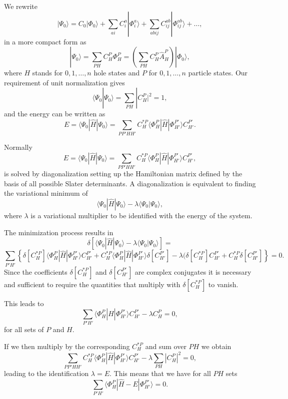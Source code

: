 We rewrite 
\[
|\Psi_0\rangle=C_0|\Phi_0\rangle+\sum_{ai}C_i^a|\Phi_i^a\rangle+\sum_{abij}C_{ij}^{ab}|\Phi_{ij}^{ab}\rangle+\dots,
\]
in a more compact form as 
\[
|\Psi_0\rangle=\sum_{PH}C_H^P\Phi_H^P=\left(\sum_{PH}C_H^P\hat{A}_H^P\right)|\Phi_0\rangle,
\]
where $H$ stands for $0,1,\dots,n$ hole states and $P$ for $0,1,\dots,n$ particle states. 
Our requirement of unit normalization gives
\[
\langle \Psi_0 | \Psi_0 \rangle = \sum_{PH}|C_H^P|^2= 1,
\]
and the energy can be written as 
\[
E= \langle \Psi_0 | \hat{H} |\Psi_0 \rangle= \sum_{PP'HH'}C_H^{*P}\langle \Phi_H^P | \hat{H} |\Phi_{H'}^{P'} \rangle C_{H'}^{P'}.
\]


Normally 
\[
E= \langle \Psi_0 | \hat{H} |\Psi_0 \rangle= \sum_{PP'HH'}C_H^{*P}\langle \Phi_H^P | \hat{H} |\Phi_{H'}^{P'} \rangle C_{H'}^{P'},
\]
is solved by diagonalization setting up the Hamiltonian matrix defined by the basis of all possible Slater determinants. A diagonalization
is equivalent to finding the variational minimum   of 
\[
 \langle \Psi_0 | \hat{H} |\Psi_0 \rangle-\lambda \langle \Psi_0 |\Psi_0 \rangle,
\]
where $\lambda$ is a variational multiplier to be identified with the energy of the system.

The minimization process results in 
\[
\delta\left[ \langle \Psi_0 | \hat{H} |\Psi_0 \rangle-\lambda \langle \Psi_0 |\Psi_0 \rangle\right]=
\]
\[
\sum_{P'H'}\left\{\delta[C_H^{*P}]\langle \Phi_H^P | \hat{H} |\Phi_{H'}^{P'} \rangle C_{H'}^{P'}+
C_H^{*P}\langle \Phi_H^P | \hat{H} |\Phi_{H'}^{P'} \rangle \delta[C_{H'}^{P'}]-
\lambda( \delta[C_H^{*P}]C_{H'}^{P'}+C_H^{*P}\delta[C_{H'}^{P'}]\right\} = 0.
\]
Since the coefficients $\delta[C_H^{*P}]$ and $\delta[C_{H'}^{P'}]$ are complex conjugates it is necessary and sufficient to require the quantities that multiply with $\delta[C_H^{*P}]$ to vanish.  

This leads to 
\[
\sum_{P'H'}\langle \Phi_H^P | \hat{H} |\Phi_{H'}^{P'} \rangle C_{H'}^{P'}-\lambda C_H^{P}=0,
\]
for all sets of $P$ and $H$.

If we then multiply by the corresponding $C_H^{*P}$ and sum over $PH$ we obtain
\[ 
\sum_{PP'HH'}C_H^{*P}\langle \Phi_H^P | \hat{H} |\Phi_{H'}^{P'} \rangle C_{H'}^{P'}-\lambda\sum_{PH}|C_H^P|^2=0,
\]
leading to the identification $\lambda = E$. This means that we have for all $PH$ sets
\begin{equation}
\sum_{P'H'}\langle \Phi_H^P | \hat{H} -E|\Phi_{H'}^{P'} \rangle = 0. \label{eq:fullci}
\end{equation}



